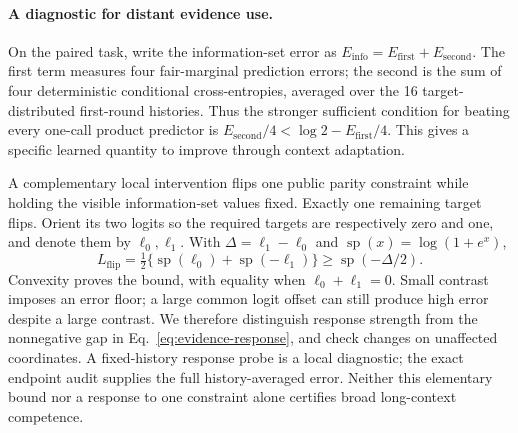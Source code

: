 \paragraph{A diagnostic for distant evidence use.}
On the paired task, write the information-set error as
$E_{\mathrm{info}}=E_{\mathrm{first}}+E_{\mathrm{second}}$.
The first term measures four fair-marginal prediction errors; the second is
the sum of four deterministic conditional cross-entropies, averaged over
the 16 target-distributed first-round histories. Thus the stronger sufficient
condition for beating every one-call product predictor is
$E_{\mathrm{second}}/4<\log2-E_{\mathrm{first}}/4$.
This gives a specific learned quantity to improve through context adaptation.

A complementary local intervention flips one public parity constraint while
holding the visible information-set values fixed. Exactly one remaining
target flips. Orient its two logits so the required targets are respectively
zero and one, and denote them by $\ell_0,\ell_1$. With
$\Delta=\ell_1-\ell_0$ and $\operatorname{sp}(x)=\log(1+e^x)$,
\begin{equation}
 L_{\mathrm{flip}}
 =\tfrac12\{\operatorname{sp}(\ell_0)+\operatorname{sp}(-\ell_1)\}
 \ge \operatorname{sp}(-\Delta/2).
 \label{eq:evidence-response}
\end{equation}
Convexity proves the bound, with equality when $\ell_0+\ell_1=0$.
Small contrast imposes an error floor; a large common logit offset can still
produce high error despite a large contrast. We therefore distinguish response
strength from the nonnegative gap in Eq.~\eqref{eq:evidence-response}, and
check changes on unaffected coordinates. A fixed-history response probe is a
local diagnostic; the exact endpoint audit supplies the full history-averaged
error. Neither this elementary bound nor a response to one constraint alone
certifies broad long-context competence.
